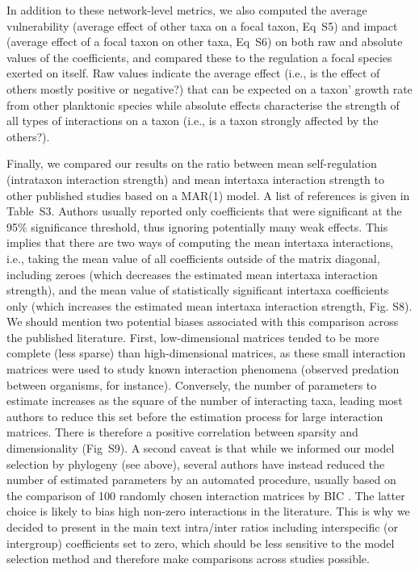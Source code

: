 \documentclass[10pt]{article}
\begin{document}
In addition to these network-level metrics, we also computed the average
vulnerability (average effect of other taxa on a focal taxon, Eq~S5)
and impact (average effect of a focal taxon on other taxa, Eq~S6)
on both raw and absolute values of the coefficients, and compared
these to the regulation a focal species exerted on itself. Raw values
indicate the average effect (i.e., is the effect of others mostly
positive or negative?) that can be expected on a taxon' growth rate
from other planktonic species while absolute effects characterise
the strength of all types of interactions on a taxon (i.e., is a taxon
strongly affected by the others?).

Finally, we compared our results on the ratio between mean self-regulation
(intrataxon interaction strength) and mean intertaxa interaction strength
to other published studies based on a MAR(1) model. A list of references
is given in Table~S3. Authors usually reported only coefficients
that were significant at the 95\% significance threshold, thus ignoring
potentially many weak effects. This implies that there are two ways
of computing the mean intertaxa interactions, i.e., taking the mean
value of all coefficients outside of the matrix diagonal, including
zeroes (which decreases the estimated mean intertaxa interaction strength),
and the mean value of statistically significant intertaxa coefficients
only (which increases the estimated mean intertaxa interaction strength,
Fig. S8). We should mention two potential biases associated with this
comparison across the published literature. First, low-dimensional
matrices tended to be more complete (less sparse) than high-dimensional
matrices, as these small interaction matrices were used to study known
interaction phenomena (observed predation between organisms, for instance).
Conversely, the number of parameters to estimate increases as the
square of the number of interacting taxa, leading most authors to
reduce this set before the estimation process for large interaction
matrices. There is therefore a positive correlation between sparsity
and dimensionality (Fig~S9). A second caveat is that while we informed
our model selection by phylogeny (see above), several authors have
instead reduced the number of estimated parameters by an automated
procedure, usually based on the comparison of 100 randomly chosen
interaction matrices by BIC \citep{ives_estimating_2003}. The latter
choice is likely to bias high non-zero interactions in the literature.
This is why we decided to present in the main text intra/inter ratios
including interspecific (or intergroup) coefficients set to zero,
which should be less sensitive to the model selection method and therefore
make comparisons across studies possible.
\end{document}
